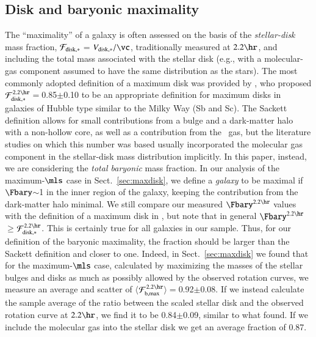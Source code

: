 \documentclass[traditabstract]{aa} %
\begin{document}
\subsection{Disk and baryonic maximality}
\label{sec:Disc-maxi}
The ``maximality'' of a galaxy is often assessed on the basis of the {\it stellar-disk}
mass fraction, $\mathcal{F}_{\rm disk,\ast}$$=$$V_{\rm disk,\ast}/\vc$, traditionally
measured at $2.2\hr$, and including the total mass associated with the stellar disk
(e.g., with a molecular-gas component assumed to have the same distribution as the stars).
%
The most commonly adopted definition of a maximum disk was provided by \cite{sackett1997}, 
who proposed $\mathcal{F}_{\rm disk,\ast}^{2.2\hr}$$=$0.85$\pm$0.10 to be an appropriate 
definition for maximum disks in galaxies of Hubble type similar to the Milky Way (Sb and 
Sc). The Sackett definition allows for small contributions from a bulge and a dark-matter 
halo with a non-hollow core, as well as a contribution from the \hone\ gas, but the 
literature studies on which this number was based usually incorporated the molecular gas
component in the stellar-disk mass distribution implicitly.
%
In this paper, instead, we are considering the {\it total baryonic} mass fraction. In our
analysis of the maximum-$\mls$ case in Sect.~\ref{sec:maxdisk}, we define a {\it galaxy}
to be maximal if $\Fbary$$\sim$1 in the inner region of the galaxy, keeping the 
contribution from the dark-matter halo minimal.
%
We still compare our measured $\Fbary^{2.2\hr}$ values with the definition of a maximum
disk in \cite{sackett1997}, but note that in general 
$\Fbary^{2.2\hr}$$\geq$$\mathcal{F}_{\rm disk,\ast}^{2.2\hr}$. This is certainly true for 
all galaxies in our sample. Thus, for our definition of the baryonic maximality, the 
fraction should be larger than the Sackett definition and closer to one.
%
Indeed, in Sect.~\ref{sec:maxdisk} we found that for the maximum-$\mls$ case, calculated
by maximizing the masses of the stellar bulges and disks as much as possibly allowed by
the observed rotation curves, we measure an average and scatter of 
$\langle$$\mathcal{F}_{\rm b,max}^{2.2\hr}$$\rangle$$=$0.92$\pm$0.08.
If we instead calculate the sample average of the ratio between the scaled stellar disk
and the observed rotation curve at $2.2\hr$, we find it to be 0.84$\pm$0.09, similar to
what \cite{sackett1997} found. If we include the molecular gas into the stellar disk we 
get an average fraction of 0.87.
\end{document}
